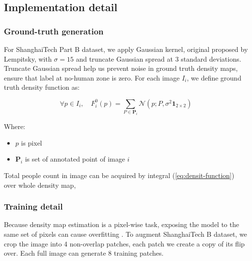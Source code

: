 \subsection{Implementation detail}

\subsubsection{Ground-truth generation} \hfill

For ShanghaiTech Part B dataset, we apply Gaussian kernel, original proposed by Lempitsky, \cite{lempitsky2010learning} with $\sigma = 15$ and truncate Gaussian spread at 3 standard deviations. Truncate Gaussian spread help us prevent noise in ground truth density maps, ensure that label at no-human zone is zero. For each image $I_i$, we define ground truth density function as: 

\begin{equation} \label{eq:densit-function}
\forall p \in I_{i}, \quad F_{i}^{0}(p)=\sum_{P \in \mathbf{P}_{i}} \mathcal{N}\left(p ; P, \sigma^{2} \mathbf{1}_{2 \times 2}\right) 
\end{equation}

Where: 
\begin{itemize}
  \item $p$ is pixel
  \item $\mathbf{P}_{i}$ is set of annotated point of image $i$
\end{itemize}

Total people count in image can be acquired by integral (\ref{eq:densit-function}) over whole density map,





\subsubsection{Training detail} \hfill

 Because density map estimation is a pixel-wise task, exposing the model to the same set of pixels can cause overfitting \cite{marsden2016fully}. To augment ShanghaiTech B dataset, we crop the image into 4 non-overlap patches, each patch we create a copy of its flip over. Each full image can generate 8 training patches. 

